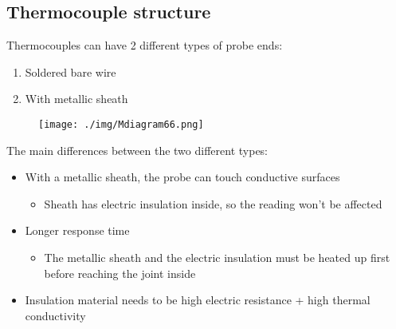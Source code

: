 \subsection{Thermocouple structure}
Thermocouples can have 2 different types of probe ends:
\begin{enumerate}
  \item Soldered bare wire
  \item With metallic sheath
\end{enumerate}
\begin{figure}[H]
  \centering
  \texttt{[image: ./img/Mdiagram66.png]}
\end{figure}
The main differences between the two different types:
\begin{itemize}
  \item With a metallic sheath, the probe can touch conductive surfaces
        \begin{itemize}
          \item Sheath has electric insulation inside, so the reading won't be affected
        \end{itemize}
  \item Longer response time
        \begin{itemize}
          \item The metallic sheath and the electric insulation must be heated up first before reaching the joint inside
        \end{itemize}
  \item Insulation material needs to be high electric resistance + high thermal conductivity
\end{itemize}
